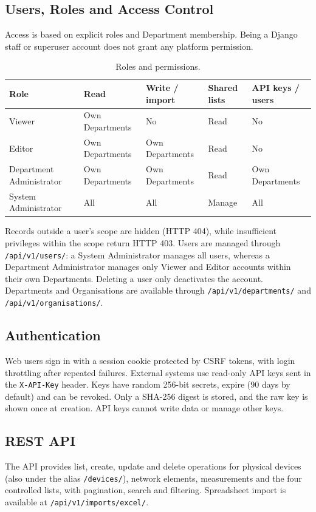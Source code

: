 \subsection{Users, Roles and Access Control}
Access is based on explicit roles and Department membership. Being a Django staff or superuser account does not grant any platform permission.

\begin{table}[h]
\centering
\begin{tabular}{|l|l|l|l|l|}
\hline
\textbf{Role} & \textbf{Read} & \textbf{Write / import} & \textbf{Shared lists} & \textbf{API keys / users} \\ \hline
Viewer & Own Departments & No & Read & No \\ \hline
Editor & Own Departments & Own Departments & Read & No \\ \hline
Department Administrator & Own Departments & Own Departments & Read & Own Departments \\ \hline
System Administrator & All & All & Manage & All \\ \hline
\end{tabular}
\caption{Roles and permissions.}
\end{table}

Records outside a user's scope are hidden (HTTP 404), while insufficient privileges within the scope return HTTP 403. Users are managed through \texttt{/api/v1/users/}: a System Administrator manages all users, whereas a Department Administrator manages only Viewer and Editor accounts within their own Departments. Deleting a user only deactivates the account. Departments and Organisations are available through \texttt{/api/v1/departments/} and \texttt{/api/v1/organisations/}.

\subsection{Authentication}
Web users sign in with a session cookie protected by CSRF tokens, with login throttling after repeated failures. External systems use read-only API keys sent in the \texttt{X-API-Key} header. Keys have random 256-bit secrets, expire (90 days by default) and can be revoked. Only a SHA-256 digest is stored, and the raw key is shown once at creation. API keys cannot write data or manage other keys.

\subsection{REST API}
The API provides list, create, update and delete operations for physical devices (also under the alias \texttt{/devices/}), network elements, measurements and the four controlled lists, with pagination, search and filtering. Spreadsheet import is available at \texttt{/api/v1/imports/excel/}.

